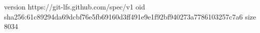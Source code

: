 version https://git-lfs.github.com/spec/v1
oid sha256:61c89294da69dcbf76e5fb69160d3ff491e9e1f92bf940273a7786103257c7a6
size 8034
